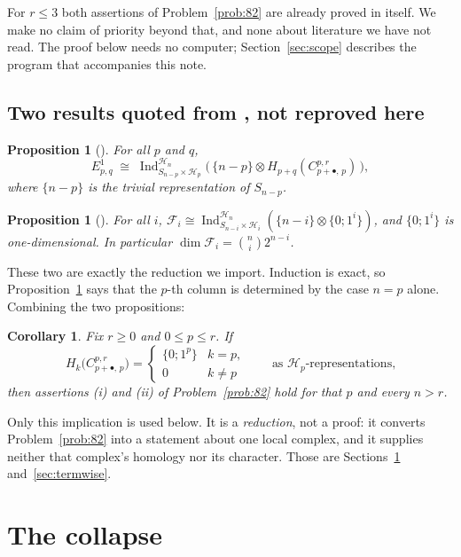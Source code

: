 \documentclass[11pt]{amsart}
\newtheorem{proposition}[theorem]{Proposition}
\newtheorem{corollary}[theorem]{Corollary}
\theoremstyle{definition}
\theoremstyle{remark}
\DeclareMathOperator{\Ind}{Ind}
\newcommand{\Hy}{\mathcal H}
\newcommand{\Fc}{\mathcal F}
\newcommand{\bl}{\bullet}
\numberwithin{equation}{section}
\begin{document}
For $r\le3$ both assertions of Problem~\ref{prob:82} are already proved in
\cite{GMW} itself. We make no claim of priority beyond that, and none about
literature we have not read. The proof below needs no computer;
Section~\ref{sec:scope} describes the program that accompanies this note.

\subsection*{Two results quoted from \cite{GMW}, not reproved here}

\begin{proposition}[\cite{GMW}]\label{prop:free}
For all $p$ and $q$,
\[
  E^1_{p,q}\;\cong\;
  \Ind_{S_{n-p}\times\Hy_p}^{\Hy_n}
  \bigl(\,\{n-p\}\otimes H_{p+q}(C^{p,r}_{p+\bl,\,p})\,\bigr),
\]
where $\{n-p\}$ is the trivial representation of $S_{n-p}$.
\end{proposition}

\begin{proposition}[\cite{GMW}]\label{prop:F}
For all $i$,
$\Fc_i\cong\Ind_{S_{n-i}\times\Hy_i}^{\Hy_n}(\{n-i\}\otimes\{0;1^i\})$, and
$\{0;1^i\}$ is one-dimensional. In particular
$\dim\Fc_i=\binom{n}{i}2^{n-i}$.
\end{proposition}

These two are exactly the reduction we import. Induction is exact, so
Proposition~\ref{prop:free} says that the $p$-th column is determined by the
case $n=p$ alone. Combining the two propositions:

\begin{corollary}\label{cor:reduce}
Fix $r\ge0$ and $0\le p\le r$. If
\[
  H_{k}\bigl(C^{p,r}_{p+\bl,\,p}\bigr)=
  \begin{cases}
    \{0;1^p\} & k=p,\\
    0 & k\neq p
  \end{cases}
  \qquad\text{as $\Hy_p$-representations,}
\]
then assertions \emph{(i)} and \emph{(ii)} of Problem~\ref{prob:82} hold for
that $p$ and \emph{every} $n>r$.
\end{corollary}

Only this implication is used below. It is a \emph{reduction}, not a proof: it
converts Problem~\ref{prob:82} into a statement about one local complex, and it
supplies neither that complex's homology nor its character. Those are
Sections~\ref{sec:object} and~\ref{sec:termwise}.

\section{The collapse}\label{sec:object}
\end{document}
